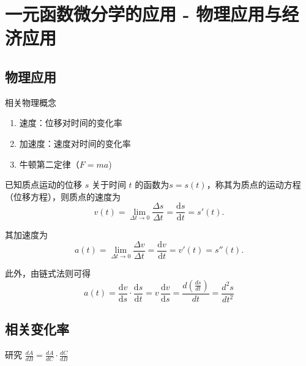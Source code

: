 \documentclass[a4paper,12pt]{article}
\begin{document}



    \section{一元函数微分学的应用 - 物理应用与经济应用}

    \subsection{物理应用}

    相关物理概念
    \begin{enumerate}
        \item 速度：位移对时间的变化率
        \item 加速度：速度对时间的变化率
        \item 牛顿第二定律（$F = ma$)
    \end{enumerate}
    \begin{analysisbox}[Example]
        已知质点运动的位移 $s$ 关于时间 $t$ 的函数为$s = s(t)$，称其为质点的运动方程（位移方程），则质点的速度为
        \[
            v(t)
            = \lim_{\Delta t \to 0} \frac{\Delta s}{\Delta t}
            = \frac{\mathrm{d}s}{\mathrm{d}t}
            = s'(t).
        \]

        其加速度为
        \[
            a(t)
            = \lim_{\Delta t \to 0} \frac{\Delta v}{\Delta t}
            = \frac{\mathrm{d}v}{\mathrm{d}t}
            = v'(t)
            = s''(t).
        \]

        此外，由链式法则可得
        \[
            a(t)
            = \frac{\mathrm{d}v}{\mathrm{d}s}\cdot\frac{\mathrm{d}s}{\mathrm{d}t}
            = v\,\frac{\mathrm{d}v}{\mathrm{d}s}
            = \frac{d(\displaystyle\frac{ds}{dt})}{dt}
            = \frac{d^{2}s}{dt^2}
        \]

    \end{analysisbox}

    \subsection{相关变化率}

    研究 $\displaystyle\frac{dA}{dB} = \displaystyle\frac{dA}{dC}\cdot \displaystyle\frac{dC}{dB}$
\end{document}
